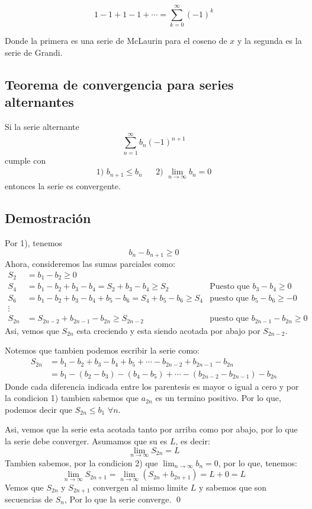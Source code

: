\documentclass[12pt,letterpaper]{article}
\begin{document}
	\[ 1-1+1-1+\cdots = \displaystyle \sum_{k=0}^{\infty}(-1)^k \]
	
	Donde la primera es una serie de McLaurin para el coseno de $x$ y la segunda es la serie de Grandi.

	\subsection{Teorema de convergencia para series alternantes}
		Si la serie alternante 
			$$ \displaystyle \sum_{n=1}^{\infty} b_n (-1)^{n+1} $$
		cumple con 
			\begin{align*}
				\mbox{1) $b_{n+1} \leq b_n$} && \mbox{2) $\displaystyle \lim_{n \rightarrow \infty} b_n = 0$} 
			\end{align*}
		entonces la serie es convergente.	

	\subsection{Demostración}
		Por 1), tenemos
			$$ b_n - b_{n+1} \geq 0 $$
		Ahora, consideremos las sumas parciales como:
			\begin{align*}		
				S_2 &= b_1-b_2 \geq 0 \\
				S_4 &= b_1-b_2+b_3-b_4 = S_2+b_3-b_4 \geq S_2 &\mbox{Puesto que $b_3-b_4 \geq 0$}\\
				S_6 &= b_1-b_2+b_3-b_4+b_5-b_6 = S_4+b_5-b_6 \geq S_4 &\mbox{puesto que $b_5-b_6 \geq -0$}\\
				\vdots \\
				S_{2n} &= S_{2n-2}+b_{2n-1}-b_{2n} \geq S_{2n-2} &\mbox{puesto que $b_{2n-1}-b_{2n} \geq 0$}
			\end{align*}		
		Asi, vemos que $S_{2n}$ esta creciendo y esta siendo acotada por abajo por $S_{2n-2}$.
		
		Notemos que tambien podemos escribir la serie como:
			\begin{align*}
				S_{2n} &= b_1-b_2+b_3-b_4+b_5+\cdots-b_{2n-2}+b_{2n-1}-b_{2n}	\\
			 				 &= b_1-(b_2-b_3)-(b_4-b_5)+\cdots-(b_{2n-2}-b_{2n-1})-b_{2n}
			\end{align*}
		Donde cada diferencia indicada entre los parentesis es mayor o igual a cero y por la condicion 1) 			tambien sabemos que $a_{2n}$ es un termino positivo. Por lo que, podemos decir que $S_{2n} \leq b_1$ $\forall n$.		
		
		Asi, vemos que la serie esta acotada tanto por arriba como por abajo, por lo que la serie debe converger. Asumamos que su es $L$, es decir:
			$$ \displaystyle \lim_{n \rightarrow \infty} S_{2n} = L $$
		Tambien sabemos, por la condicion 2) que $\lim_{n \rightarrow \infty} b_n = 0$, por lo que, tenemos:
			\[ \displaystyle \lim_{n \rightarrow \infty} S_{2n+1} =  \displaystyle \lim_{n \rightarrow \infty} (S_{2n}+b_{2n+1}) = L + 0 = L \]
		Vemos que $S_{2n}$ y $S_{2n+1}$ convergen al mismo limite $L$ y sabemos que son secuencias de $S_n$, Por lo que la serie converge. 
		\qed	
\end{document}
